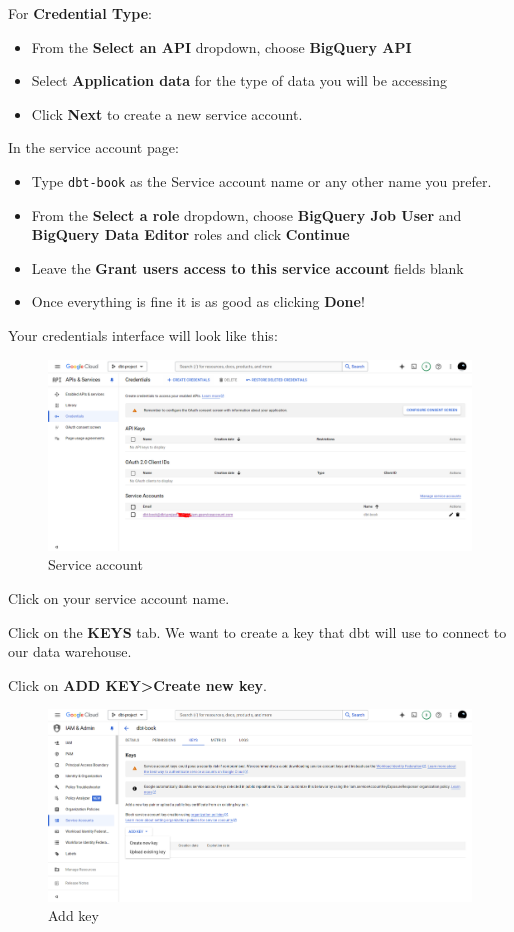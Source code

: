 \documentclass[
]{book}
\begin{document}
For \textbf{Credential Type}:

\begin{itemize}
\item
  From the \textbf{Select an API} dropdown, choose \textbf{BigQuery API}
\item
  Select \textbf{Application data} for the type of data you will be accessing
\item
  Click \textbf{Next} to create a new service account.
\end{itemize}

In the service account page:

\begin{itemize}
\item
  Type \texttt{dbt-book} as the Service account name or any other name you prefer.
\item
  From the \textbf{Select a role} dropdown, choose \textbf{BigQuery Job User} and \textbf{BigQuery Data Editor} roles and click \textbf{Continue}
\item
  Leave the \textbf{Grant users access to this service account} fields blank
\item
  Once everything is fine it is as good as clicking \textbf{Done}!
\end{itemize}

Your credentials interface will look like this:

\begin{figure}
\centering
\includegraphics{./images/service-account.png}
\caption{Service account}
\end{figure}

Click on your service account name.

Click on the \textbf{KEYS} tab. We want to create a key that dbt will use to connect to our data warehouse.

Click on \textbf{ADD KEY\textgreater Create new key}.

\begin{figure}
\centering
\includegraphics{./images/add-key.png}
\caption{Add key}
\end{figure}
\end{document}
